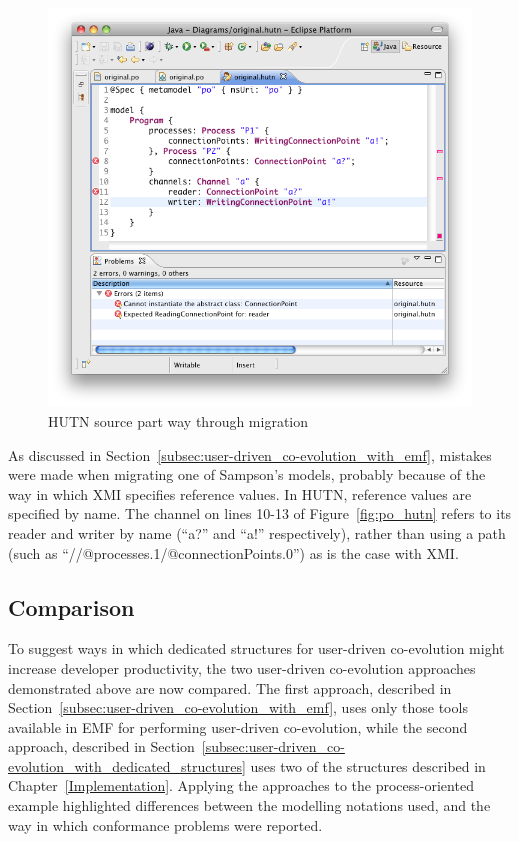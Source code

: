 \begin{figure}[htbp]
  \centering
  \includegraphics[width=13.5cm]{6.Evaluation/images/user_driven/po_hutn_partial.png}
  \caption{HUTN source part way through migration}
  \label{fig:po_hutn_partial}
\end{figure}

As discussed in Section~\ref{subsec:user-driven_co-evolution_with_emf}, mistakes were made when migrating one of Sampson's models, probably because of the way in which XMI specifies reference values. In HUTN, reference values are specified by name. The channel on lines 10-13 of Figure~\ref{fig:po_hutn} refers to its reader and writer by name (``a?'' and ``a!'' respectively), rather than using a path (such as ``//@processes.1/@connectionPoints.0'') as is the case with XMI. 

\subsection{Comparison}
\label{subsec:user_driven_example_comparison}
To suggest ways in which dedicated structures for user-driven co-evolution might increase developer productivity, the two user-driven co-evolution approaches demonstrated above are now compared. The first approach, described in Section~\ref{subsec:user-driven_co-evolution_with_emf}, uses only those tools available in EMF for performing user-driven co-evolution, while the second approach, described in Section~\ref{subsec:user-driven_co-evolution_with_dedicated_structures} uses two of the structures described in Chapter~\ref{Implementation}. Applying the approaches to the process-oriented example highlighted differences between the modelling notations used, and the way in which conformance problems were reported.

